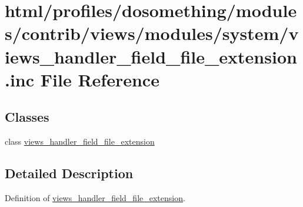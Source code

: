 \hypertarget{views__handler__field__file__extension_8inc}{
\section{html/profiles/dosomething/modules/contrib/views/modules/system/views\_\-handler\_\-field\_\-file\_\-extension.inc File Reference}
\label{views__handler__field__file__extension_8inc}
}
\subsection*{Classes}
\begin{DoxyCompactItemize}
\item 
class \hyperlink{classviews__handler__field__file__extension}{views\_\-handler\_\-field\_\-file\_\-extension}
\end{DoxyCompactItemize}


\subsection{Detailed Description}
Definition of \hyperlink{classviews__handler__field__file__extension}{views\_\-handler\_\-field\_\-file\_\-extension}. 